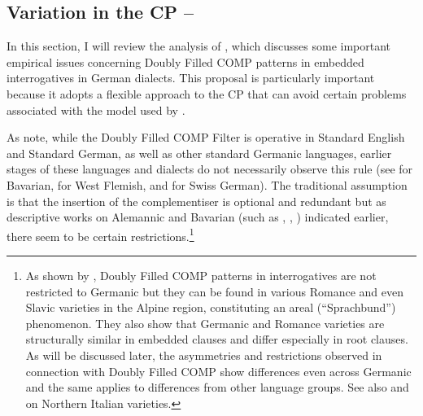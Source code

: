 \subsection{Variation in the CP -- \citet{bayerbrandner2008}} \label{sec:3bayerbrandner}
In this section, I will review the analysis of \citet{bayerbrandner2008}, which discusses some important empirical issues concerning Doubly Filled COMP patterns in embedded interrogatives in German dialects. This proposal is particularly important because it adopts a flexible approach to the CP that can avoid certain problems associated with the model used by \citet{chomskylasnik1977}.

As \citet[87]{bayerbrandner2008} note, while the Doubly Filled COMP Filter is operative in Standard English and Standard German, as well as other standard Germanic languages, earlier stages of these languages and dialects do not necessarily observe this rule (see \citealt{bayer1984} for Bavarian, \citealt{haegeman1992} for West Flemish, \citealt{pennerbader1995} and \citealt{schoenenberger2006} for Swiss German). The traditional assumption is that the insertion of the complementiser is optional and redundant but as descriptive works on Alemannic and Bavarian (such as \citealt{noth1993}, \citealt{schiepek1899}, \citealt{steininger1994}) indicated earlier, there seem to be certain restrictions.\footnote{As shown by \citet{schallertbidese2021}, Doubly Filled COMP patterns in interrogatives are not restricted to Germanic but they can be found in various Romance and even Slavic varieties in the Alpine region, constituting an areal (``Sprachbund'') phenomenon. They also show that Germanic and Romance varieties are structurally similar in embedded clauses and differ especially in root clauses. As will be discussed later, the asymmetries and restrictions observed in connection with Doubly Filled COMP show differences even across Germanic and the same applies to differences from other language groups. See also \citet{poletto2000} and \citet{polettovanelli1997} on Northern Italian varieties.}  

